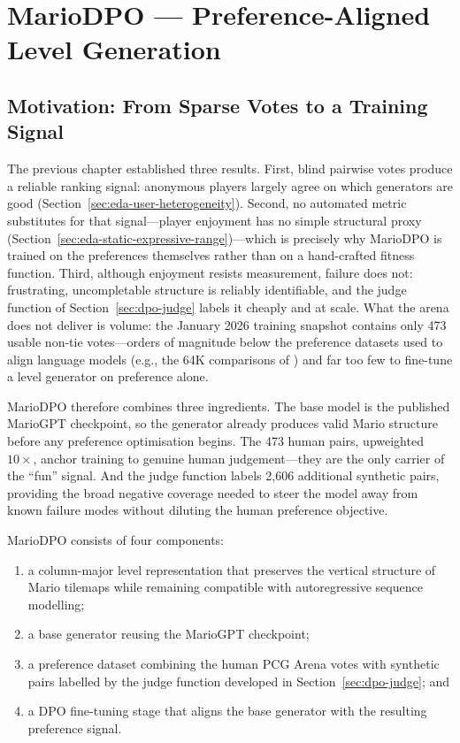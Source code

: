 \documentclass[shortabstract, mgr, english]{iithesis}
\begin{document}
\chapter{MarioDPO --- Preference-Aligned Level Generation}
\label{ch:mariodpo}


\section[Motivation: From Sparse Votes to a Training Signal]{Motivation: From Sparse Votes to a Training Signal}
\label{sec:dpo-motivation}

The previous chapter established three results. First, blind pairwise
votes produce a reliable ranking signal: anonymous players largely agree on
which generators are good (Section~\ref{sec:eda-user-heterogeneity}). Second,
no automated metric substitutes for that signal---player enjoyment has no
simple structural proxy
(Section~\ref{sec:eda-static-expressive-range})---which is precisely why
MarioDPO is trained on the preferences themselves rather than on a
hand-crafted fitness function. Third, although enjoyment resists measurement,
failure does not: frustrating, uncompletable structure is reliably
identifiable, and the judge function of Section~\ref{sec:dpo-judge} labels it
cheaply and at scale. What the arena does not deliver is volume: the
January 2026 training snapshot contains only 473 usable non-tie
votes---orders of magnitude below the preference datasets used to align
language models (e.g., the 64K comparisons of \citet{stiennon2020learning})
and far too few to fine-tune a level generator on preference alone.

MarioDPO therefore combines three ingredients. The base model is the
published MarioGPT checkpoint, so the generator already produces valid Mario
structure before any preference optimisation begins. The 473 human
pairs, upweighted $10\times$, anchor training to genuine human
judgement---they are the only carrier of the ``fun'' signal. And the judge
function labels 2,606 additional synthetic pairs, providing the broad negative
coverage needed to steer the model away from known failure modes without
diluting the human preference objective.

MarioDPO consists of four components:
\begin{enumerate}[nosep]
  \item a column-major level representation that preserves the vertical structure
        of Mario tilemaps while remaining compatible with autoregressive
        sequence modelling;
  \item a base generator reusing the MarioGPT checkpoint;
  \item a preference dataset combining the human PCG Arena votes with
        synthetic pairs labelled by the judge function developed in
        Section~\ref{sec:dpo-judge}; and
  \item a DPO fine-tuning stage that aligns the base generator with
        the resulting preference signal.
\end{enumerate}
\end{document}
